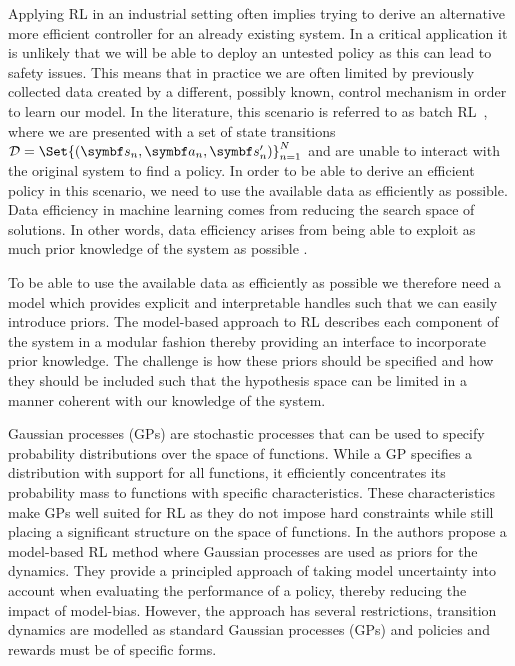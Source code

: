 Applying RL in an industrial setting often implies trying to derive an alternative more efficient controller for an already existing system.
In a critical application it is unlikely that we will be able to deploy an untested policy as this can lead to safety issues.
This means that in practice we are often limited by previously collected data created by a different, possibly known, control mechanism in order to learn our model.
In the literature, this scenario is referred to as batch RL~\parencite{lange_batch_2012}, where we are presented with a set of state transitions $\Dc = \Set{(\mat{s}_n, \mat{a}_n, \mat{s}_n^\prime)}_{n=1}^N$ and are unable to interact with the original system to find a policy.
In order to be able to derive an efficient policy in this scenario, we need to use the available data as efficiently as possible.
Data efficiency in machine learning comes from reducing the search space of solutions.
In other words, data efficiency arises from being able to exploit as much prior knowledge of the system as possible \parencite{shalev-shwartz_understanding_2014}.

To be able to use the available data as efficiently as possible we therefore need a model which provides explicit and interpretable handles such that we can easily introduce priors.
The model-based approach to RL describes each component of the system in a modular fashion thereby providing an interface to incorporate prior knowledge.
The challenge is how these priors should be specified and how they should be included such that the hypothesis space can be limited in a manner coherent with our knowledge of the system.

Gaussian processes (GPs) are stochastic processes that can be used to specify probability distributions over the space of functions.
While a GP specifies a distribution with support for all functions, it efficiently concentrates its probability mass to functions with specific characteristics.
These characteristics make GPs well suited for RL as they do not impose hard constraints while still placing a significant structure on the space of functions.
In \parencite{deisenroth_pilco_2011} the authors propose a model-based RL method where Gaussian processes are used as priors for the dynamics.
They provide a principled approach of taking model uncertainty into account when evaluating the performance of a policy, thereby reducing the impact of model-bias.
However, the approach has several restrictions, transition dynamics are modelled as standard Gaussian processes (GPs) and policies and rewards must be of specific forms.

